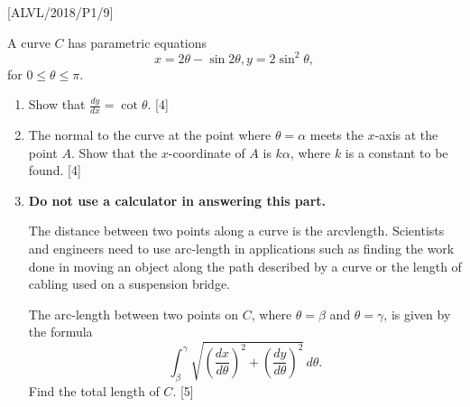 \item {[}ALVL/2018/P1/9{]}

A curve $C$ has parametric equations 
\[
x=2\theta-\sin2\theta,y=2\sin^{2}\theta,
\]
for $0\leq\theta\leq\pi$. 
\begin{enumerate}
\item Show that $\frac{dy}{dx}=\cot\theta$.\hfill{} {[}4{]}
\item The normal to the curve at the point where $\theta=\alpha$ meets
the $x$-axis at the point $A$. Show that the $x$-coordinate of
$A$ is $k\alpha$, where $k$ is a constant to be found.\hfill{}
{[}4{]}
\item \textbf{Do not use a calculator in answering this part.} 

The distance between two points along a curve is the arcvlength. Scientists
and engineers need to use arc-length in applications such as finding
the work done in moving an object along the path described by a curve
or the length of cabling used on a suspension bridge. 

The arc-length between two points on $C$, where $\theta=\beta$ and
$\theta=\gamma$, is given by the formula 
\[
\int_{\beta}^{\gamma}\sqrt{\left(\frac{dx}{d\theta}\right)^{2}+\left(\frac{dy}{d\theta}\right)^{2}}\,d\theta.
\]
Find the total length of $C$.\hfill{} {[}5{]}
\end{enumerate}

